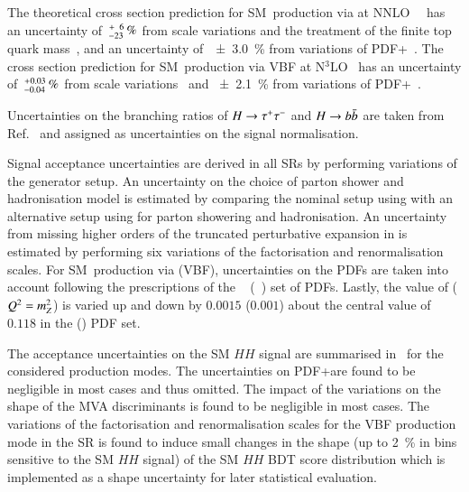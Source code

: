 The theoretical cross section prediction for SM~\HH production via \ggF at
NNLO~\FTapprox~\cite{Grazzini:2018bsd} has an uncertainty
of~$^{\hspace{0.25pt}+\hspace{0.25pt}\phantom{2}6}_{-23}\,\si{\percent}$
from scale variations and the treatment of the finite top quark
mass~\cite{Baglio:2020wgt}, and an uncertainty of~\SI{\pm 3.0}{\percent} from
variations of PDF+\alphas~\cite{LHCHWGHH}. The cross section prediction for
SM~\HH production via VBF at N$^3$LO~\cite{Dreyer:2018qbw} has an uncertainty
of~$^{\hspace{0.25pt}+\hspace{0.25pt}0.03}_{-0.04}\,\si{\percent}$ from
scale variations~\cite{LHCHWGHH} and \SI{\pm 2.1}{\percent} from variations of
PDF+\alphas~\cite{LHCHWGHH}.

Uncertainties on the branching ratios of $H \to \tau^{+} \tau^{-}$ and $H \to b\bar{b}$ are
taken from Ref.~\cite{deFlorian:2016spz} and assigned as uncertainties on the
signal normalisation.

Signal acceptance uncertainties are derived in all SRs by performing variations
of the generator setup. An uncertainty on the choice of parton shower and
hadronisation model is estimated by comparing the nominal setup using \PYTHIA[8]
with an alternative setup using \HERWIG[7] for parton showering and
hadronisation. An uncertainty from missing higher orders of the truncated
perturbative expansion in \alphas is estimated by performing six variations of
the factorisation and renormalisation scales. For SM~\HH production via \ggF
(VBF), uncertainties on the PDFs are taken into account following the
prescriptions of the \PDFforLHC[15nlo]~\cite{Butterworth:2015oua}
(\NNPDF[3.0nlo]~\cite{Ball:2014uwa}) set of PDFs. Lastly, the value of \alphas
($Q^2 = m_{Z}^2$) is varied up and down by $0.0015$ ($0.001$) about the central
value of $0.118$ in the \PDFforLHC[15nlo] (\NNPDF[3.0nlo]) PDF set.


The acceptance uncertainties on the SM $HH$ signal are summarised
in~ for the considered production modes. The
uncertainties on PDF+\alphas are found to be negligible in most cases and thus
omitted. The impact of the variations on the shape of the MVA discriminants is
found to be negligible in most cases. The variations of the factorisation and
renormalisation scales for the VBF production mode in the \hadhad SR is found to
induce small changes in the shape (up to \SI{2}{\percent} in bins sensitive to
the SM $HH$ signal) of the SM $HH$ BDT score distribution which is implemented
as a shape uncertainty for later statistical evaluation.

